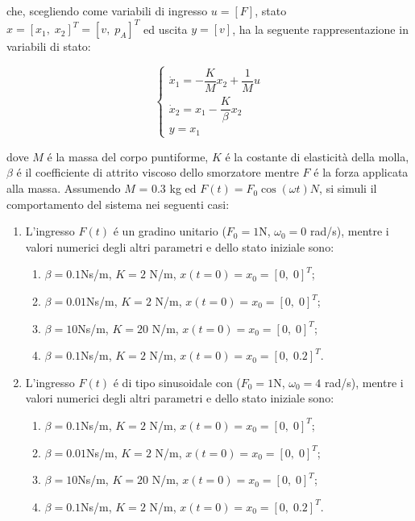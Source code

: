 \documentclass[../main.tex]{subfiles}
\begin{document}
che, scegliendo come variabili di ingresso $u = [F]$, stato $x = [x_1, \; x_2]^T = [v, \; p_A]^T$  ed uscita $y = [v]$, ha la seguente rappresentazione in variabili di stato:

\begin{equation}
	\begin{cases}	
	\dot x_1 = - \dfrac{K}{M}x_2 + \dfrac{1}{M}u \\
	\dot x_2 = x_1 - \dfrac{K}{\beta} x_2 \\
	y = x_1		
	\end{cases}
\end{equation}  

dove $M$ é la massa del corpo puntiforme, $K$ é la costante di elasticità della molla, $\beta$ é il coefficiente di attrito viscoso dello smorzatore mentre $F$ é la forza applicata alla massa. Assumendo $M$ = 0.3 kg ed $F(t) = F_0 \cos( \omega t) N$, si simuli il comportamento del sistema nei seguenti casi:

\begin{enumerate}
	\item L'ingresso $F(t)$ é un gradino unitario ($F_0 = 1$N, $\omega_0 = 0$ rad/s), mentre i valori numerici degli altri parametri e dello stato iniziale sono:
	
	\begin{enumerate}[label=\alph*)]
		\item $\beta = 0.1$Ns/m, $K = 2$ N/m, $x(t=0) = x_0 = [0,\;0]^T$;
		\item $\beta = 0.01$Ns/m, $K = 2$ N/m, $x(t=0) = x_0 = [0,\;0]^T$;
		\item $\beta = 10$Ns/m, $K = 20$ N/m, $x(t=0) = x_0 = [0,\;0]^T$;
		\item $\beta = 0.1$Ns/m, $K = 2$ N/m, $x(t=0) = x_0 = [0,\;0.2]^T$.
	\end{enumerate}
	
	\item L'ingresso $F(t)$ é di tipo sinusoidale con ($F_0 = 1$N, $\omega_0 = 4$ rad/s), mentre i valori numerici degli altri parametri e dello stato iniziale sono:

	\begin{enumerate}[label=\alph*)]
		\item $\beta = 0.1$Ns/m, $K = 2$ N/m, $x(t=0) = x_0 = [0,\;0]^T$;
		\item $\beta = 0.01$Ns/m, $K = 2$ N/m, $x(t=0) = x_0 = [0,\;0]^T$;
		\item $\beta = 10$Ns/m, $K = 20$ N/m, $x(t=0) = x_0 = [0,\;0]^T$;
		\item $\beta = 0.1$Ns/m, $K = 2$ N/m, $x(t=0) = x_0 = [0,\;0.2]^T$.
	\end{enumerate} 	
\end{enumerate}
\end{document}
